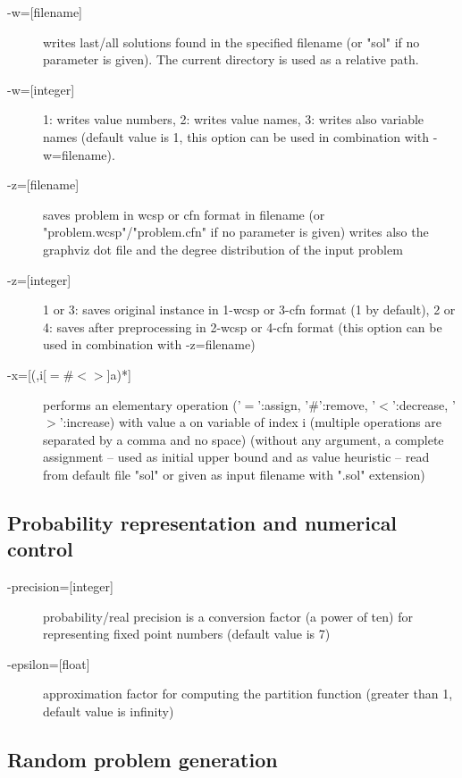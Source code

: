 \documentclass{article}
\begin{document}
\begin{description}
\item[{-w=[filename]}] writes last/all solutions found in the specified
  filename (or "sol" if no parameter is given). The current directory
  is used as a relative path.
\item[{-w=[integer]}] 1: writes value numbers, 2: writes value names, 3: writes also variable names (default value is 1, this option can be used in combination with -w=filename).
\item[{-z=[filename]}] saves problem in wcsp or cfn format in filename (or
  "problem.wcsp"/"problem.cfn" if no parameter is given) writes also the graphviz
  dot file and the degree distribution of the input problem
\item[{-z=[integer]}] 1 or 3: saves original instance in 1-wcsp or 3-cfn format (1 by default), 2 or 4: saves
  after preprocessing in 2-wcsp or 4-cfn format (this option can be used in combination with -z=filename)
\item[{-x=[(,i[$=\#<>$]a)*]}] performs an elementary operation ('$=$':assign, '$\#$':remove, '$<$':decrease, '$>$':increase) with value a on variable of index i (multiple
  operations are separated by a comma and no space) (without any
  argument, a complete assignment -- used as initial upper bound and
  as value heuristic -- read from default file "sol" or given as input
  filename with ".sol" extension)
\end{description}

\subsection{Probability representation and numerical control}

\begin{description}
\item[{-precision=[integer]}] probability/real precision is a conversion
  factor (a power of ten) for representing fixed point numbers
  (default value is 7)
\item[{-epsilon=[float]}] approximation factor for computing the partition
  function (greater than 1, default value is infinity)
\end{description}
 
\subsection{Random problem generation}
\end{document}
